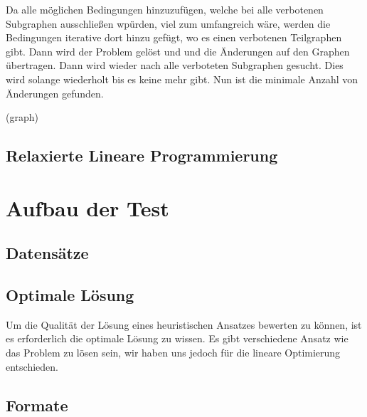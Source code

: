 \documentclass[12pt,a4paper,onecolumn,oneside,titlepage]{article}
\begin{document}
Da alle möglichen Bedingungen hinzuzufügen, welche bei alle verbotenen Subgraphen ausschließen wpürden, viel zum umfangreich wäre, werden die Bedingungen iterative dort hinzu gefügt, wo es einen verbotenen Teilgraphen gibt. Dann wird der Problem gelöst und und die Änderungen auf den Graphen übertragen. Dann wird wieder nach alle verboteten Subgraphen gesucht. Dies wird solange wiederholt bis es keine mehr gibt. Nun ist die minimale Anzahl von Änderungen gefunden. 
\pagebreak
\begin{center}
  \label{euclid}
\begin{algorithmic}[1]
				\Else 
				\EndIf
			\EndFor
		\EndFor
	\EndWhile
\EndFor

\Return(graph)
\EndFunction
\end{algorithmic}
\end{center}



\subsection{Relaxierte Lineare Programmierung}


\section{Aufbau der Test}
\subsection{Datensätze}
\subsection{Optimale Lösung}
Um die Qualität der Lösung eines heuristischen Ansatzes bewerten zu können, ist es erforderlich die optimale Lösung zu wissen. Es gibt verschiedene Ansatz wie das Problem zu lösen sein, wir haben uns jedoch für die lineare Optimierung entschieden.


\subsection{Formate}
\end{document}
